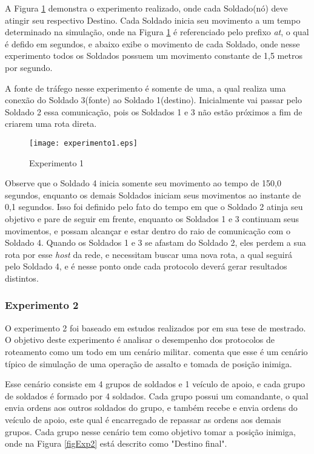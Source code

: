 A Figura \ref{figExp1} demonstra o experimento realizado, onde cada Soldado(n\'o) deve atingir seu respectivo Destino.
Cada Soldado inicia seu movimento a um tempo determinado na simula\c{c}\~ao, onde na Figura \ref{figExp1} \'e referenciado pelo prefixo \textit{at}, o qual \'e defido em segundos, e abaixo exibe o movimento de cada Soldado, onde nesse experimento todos os Soldados possuem um movimento constante de 1,5 metros por segundo. 

A fonte de tr\'afego nesse experimento \'e somente de uma, a qual realiza uma conex\~ao do Soldado 3(fonte) ao Soldado 1(destino). Inicialmente vai passar pelo Soldado 2 essa comunica\c{c}\~ao, pois os Soldados 1 e 3 n\~ao est\~ao pr\'oximos a fim de criarem uma rota direta.

\begin{figure}[H]
	\centering
	\texttt{[image: experimento1.eps]}
	\caption{Experimento 1}
	\label{figExp1}
\end{figure}

Observe que o Soldado 4 inicia somente seu movimento ao tempo de 150,0 segundos, enquanto os demais Soldados iniciam seus movimentos ao instante de 0,1 segundos.
Isso foi definido pelo fato do tempo em que o Soldado 2 atinja seu objetivo e pare de seguir em frente, enquanto os Soldados 1 e 3 continuam seus movimentos, e possam alcan\c{c}ar e estar dentro do raio de comunica\c{c}\~ao com o Soldado 4.
Quando os Soldados 1 e 3 se afastam do Soldado 2, eles perdem a sua rota por esse \textit{host} da rede, e necessitam buscar uma nova rota, a qual seguir\'a pelo Soldado 4, e \'e nesse ponto onde cada protocolo dever\'a gerar resultados distintos.

\subsubsection{Experimento 2}
O experimento 2 foi baseado em estudos realizados por \cite{pereira} em sua tese de mestrado. 
O objetivo deste experimento \'e analisar o desempenho dos protocolos de roteamento como um todo em um cen\'ario militar. 
\cite{pereira} comenta que esse \'e um cen\'ario t\'ipico de simula\c{c}\~ao de uma opera\c{c}\~ao de assalto e tomada de posi\c{c}\~ao inimiga.

Esse cen\'ario consiste em 4 grupos de soldados e 1 ve\'iculo de apoio, e cada grupo de soldados \'e formado por 4 soldados.
Cada grupo possui um comandante, o qual envia ordens aos outros soldados do grupo, e tamb\'em recebe e envia ordens do ve\'iculo de apoio, este qual \'e encarregado de repassar as ordens aos demais grupos.
Cada grupo nesse cen\'ario tem como objetivo tomar a posi\c{c}\~ao inimiga, onde na Figura \ref{figExp2} est\'a descrito como "Destino final".

